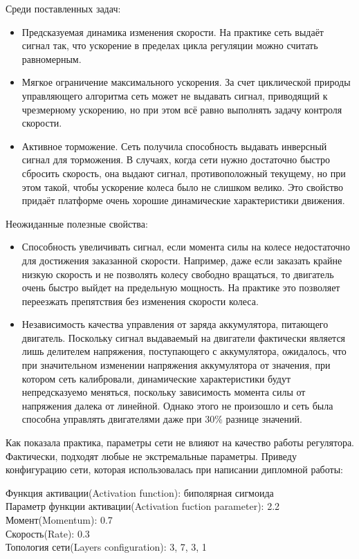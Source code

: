 \documentclass[14pt]{extreport}
\begin{document}
            Среди поставленных задач:
                \begin{itemize}
                  \item Предсказуемая динамика изменения скорости. На практике сеть выдаёт сигнал так, что ускорение в пределах цикла регуляции можно считать равномерным.
                  \item Мягкое ограничение максимального ускорения. За счет циклической природы управляющего алгоритма сеть может не выдавать сигнал, приводящий к чрезмерному ускорению, но при этом всё равно выполнять задачу контроля скорости.
                  \item Активное торможение. Сеть получила способность выдавать инверсный сигнал для торможения. В случаях, когда сети нужно достаточно быстро сбросить скорость, она выдают сигнал, противоположный текущему, но при этом такой, чтобы ускорение колеса было не слишком велико. Это свойство придаёт платформе очень хорошие динамические характеристики движения.
                \end{itemize}
            Неожиданные полезные свойства:
                \begin{itemize}
                  \item Способность увеличивать сигнал, если момента силы на колесе недостаточно для достижения заказанной скорости. Например, даже если заказать крайне низкую скорость и не позволять колесу свободно вращаться, то двигатель очень быстро выйдет на предельную мощность. На практике это позволяет переезжать препятствия без изменения скорости колеса.
                  \item Независимость качества управления от заряда аккумулятора, питающего двигатель. Поскольку сигнал выдаваемый на двигатели фактически является лишь делителем напряжения, поступающего с аккумулятора, ожидалось, что при значительном изменении напряжения аккумулятора от значения, при котором сеть калибровали, динамические характеристики будут непредсказуемо меняться, поскольку зависимость момента силы от напряжения далека от линейной. Однако этого не произошло и сеть была способна управлять двигателями даже при 30\% разнице значений.
                \end{itemize}

            Как показала практика, параметры сети не влияют на качество работы регулятора. Фактически, подходят любые не экстремальные параметры. Приведу конфигурацию сети, которая использовалась при написании дипломной работы:
                \begin{center}
                  Функция активации(Activation function): биполярная сигмоида\\
                  Параметр функции активации(Activation fuction parameter): 2.2\\
                  Момент(Momentum): 0.7\\
                  Скорость(Rate): 0.3\\
                  Топология сети(Layers configuration): 3, 7, 3, 1
                \end{center}
\end{document}
